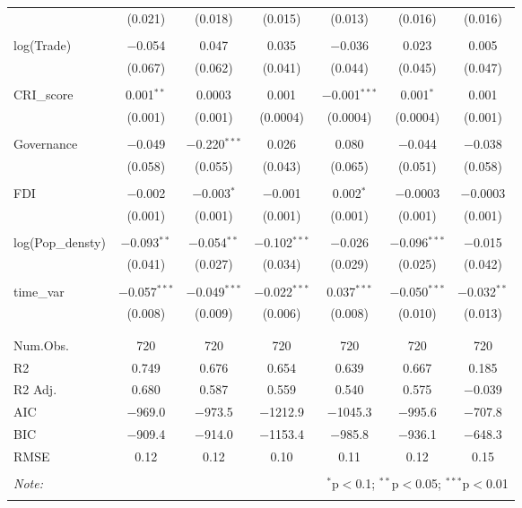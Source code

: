 \begin{longtable}{@{\extracolsep{-3pt}}lcccccc}
  & (0.021) & (0.018) & (0.015) & (0.013) & (0.016) & (0.016) \\ 
  & & & & & & \\ 
 log(Trade) & $-$0.054 & 0.047 & 0.035 & $-$0.036 & 0.023 & 0.005 \\ 
  & (0.067) & (0.062) & (0.041) & (0.044) & (0.045) & (0.047) \\ 
  & & & & & & \\ 
 CRI\_score & 0.001$^{**}$ & 0.0003 & 0.001 & $-$0.001$^{***}$ & 0.001$^{*}$ & 0.001 \\ 
  & (0.001) & (0.001) & (0.0004) & (0.0004) & (0.0004) & (0.001) \\ 
  & & & & & & \\ 
 Governance & $-$0.049 & $-$0.220$^{***}$ & 0.026 & 0.080 & $-$0.044 & $-$0.038 \\ 
  & (0.058) & (0.055) & (0.043) & (0.065) & (0.051) & (0.058) \\ 
  & & & & & & \\ 
 FDI & $-$0.002 & $-$0.003$^{*}$ & $-$0.001 & 0.002$^{*}$ & $-$0.0003 & $-$0.0003 \\ 
  & (0.001) & (0.001) & (0.001) & (0.001) & (0.001) & (0.001) \\ 
  & & & & & & \\ 
 log(Pop\_densty) & $-$0.093$^{**}$ & $-$0.054$^{**}$ & $-$0.102$^{***}$ & $-$0.026 & $-$0.096$^{***}$ & $-$0.015 \\ 
  & (0.041) & (0.027) & (0.034) & (0.029) & (0.025) & (0.042) \\ 
  & & & & & & \\ 
 time\_var & $-$0.057$^{***}$ & $-$0.049$^{***}$ & $-$0.022$^{***}$ & 0.037$^{***}$ & $-$0.050$^{***}$ & $-$0.032$^{**}$ \\ 
  & (0.008) & (0.009) & (0.006) & (0.008) & (0.010) & (0.013) \\ 
  & & & & & & \\ 
\hline \\[-1.8ex]
Num.Obs. & \num{720} & \num{720} & \num{720} & \num{720} & \num{720} & \num{720}\\
R2 & \num{0.749} & \num{0.676} & \num{0.654} & \num{0.639} & \num{0.667} & \num{0.185}\\
R2 Adj. & \num{0.680} & \num{0.587} & \num{0.559} & \num{0.540} & \num{0.575} & \num{-0.039}\\
AIC & \num{-969.0} & \num{-973.5} & \num{-1212.9} & \num{-1045.3} & \num{-995.6} & \num{-707.8}\\
BIC & \num{-909.4} & \num{-914.0} & \num{-1153.4} & \num{-985.8} & \num{-936.1} & \num{-648.3}\\
RMSE & \num{0.12} & \num{0.12} & \num{0.10} & \num{0.11} & \num{0.12} & \num{0.15}\\
\bottomrule
\hline \\[-1.8ex] 
\textit{Note:}  & \multicolumn{6}{r}{$^{*}$p$<$0.1; $^{**}$p$<$0.05; $^{***}$p$<$0.01} \\ 
\label{Tab::roburstMainModel_FE}
\end{longtable}